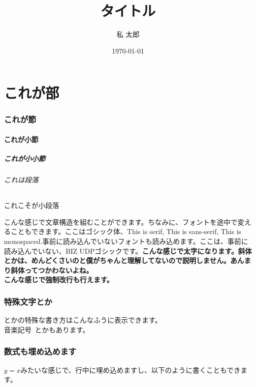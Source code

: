 \documentclass[paper=a4paper,fontsize=10pt]{jlreq}
\begin{document}
\title{タイトル}
\author{私 太郎}
\date{\today}
\maketitle

\tableofcontents

\part{これが部}
\section{これが節}
\subsection{これが小節}
\subsubsection{これが小小節}
\paragraph{これは段落}
\subparagraph{これこそが小段落}
こんな感じで文章構造を組むことができます。ちなみに、フォントを途中で変えることもできます。\gtfamily ここはゴシック体、\rmfamily This is serif, \sffamily This is sans-serif, \ttfamily This is monospaced.\rmfamily \mcfamily 事前に読み込んでいないフォントも読み込めます。ここは、事前に読み込んでいない、BIZ UDPゴシックです。\rmfamily\mcfamily\bfseries{こんな感じで太字になります。}\mdseries 斜体とかは、めんどくさいのと僕がちゃんと理解してないので説明しません。あんまり斜体ってつかわないよね。\\
こんな感じで強制改行も行えます。

\section{特殊文字とか}
\mathrm{\LaTeX} とかの特殊な書き方はこんなふうに表示できます。\\
音楽記号\sharp \ \flat とかもあります。

\section{数式も埋め込めます}
$y = x$みたいな感じで、行中に埋め込めますし、以下のように書くこともできます。\\
\end{document}
